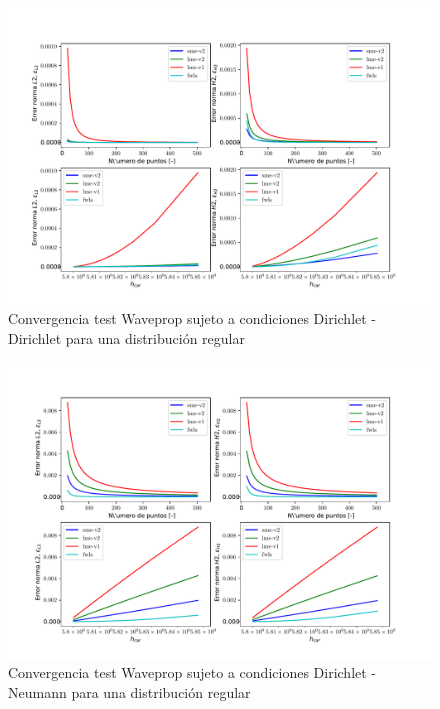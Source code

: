 \begin{figure}
    \centering
    \includegraphics[width=1\textwidth]{./Imagenes/06/comparacion_shp_regular/Waveprop_regular_type-2_caso-1_direct_dgesv-lapack-blas_sme-v2_lme-v2_lme-v1_fwls.pdf}
    \caption{Convergencia test Waveprop sujeto a condiciones Dirichlet - Dirichlet para una distribución regular} \label{fig:Waveprop_caso-1_conv}
\end{figure}
\begin{figure}
    \centering
    \includegraphics[width=1\textwidth]{./Imagenes/06/comparacion_shp_regular/Waveprop_regular_type-2_caso-2_direct_dgesv-lapack-blas_sme-v2_lme-v2_lme-v1_fwls.pdf}
    \caption{Convergencia test Waveprop sujeto a condiciones Dirichlet - Neumann para una distribución regular} \label{fig:Waveprop_caso-2_conv}
\end{figure}
